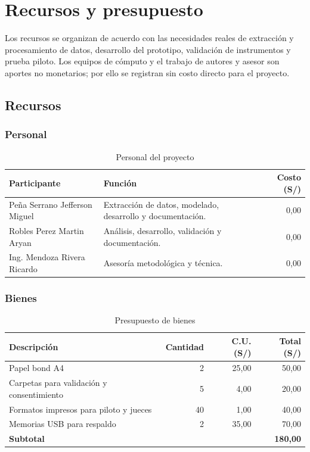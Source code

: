 \section{Recursos y presupuesto}

Los recursos se organizan de acuerdo con las necesidades reales de extracción y procesamiento de datos, desarrollo del prototipo, validación de instrumentos y prueba piloto. Los equipos de cómputo y el trabajo de autores y asesor son aportes no monetarios; por ello se registran sin costo directo para el proyecto.

\subsection{Recursos}

\subsubsection{Personal}

\begin{table}[H]
\centering
\caption{Personal del proyecto}
\small
\begin{tabularx}{\textwidth}{p{4.2cm}Xr}
\toprule
\textbf{Participante} & \textbf{Función} & \textbf{Costo (S/)} \\
\midrule
Peña Serrano Jefferson Miguel & Extracción de datos, modelado, desarrollo y documentación. & 0,00 \\
Robles Perez Martin Aryan & Análisis, desarrollo, validación y documentación. & 0,00 \\
Ing. Mendoza Rivera Ricardo & Asesoría metodológica y técnica. & 0,00 \\
\bottomrule
\end{tabularx}
\end{table}

\subsubsection{Bienes}

\begin{table}[H]
\centering
\caption{Presupuesto de bienes}
\small
\begin{tabularx}{\textwidth}{Xrrr}
\toprule
\textbf{Descripción} & \textbf{Cantidad} & \textbf{C.U. (S/)} & \textbf{Total (S/)} \\
\midrule
Papel bond A4 & 2 & 25,00 & 50,00 \\
Carpetas para validación y consentimiento & 5 & 4,00 & 20,00 \\
Formatos impresos para piloto y jueces & 40 & 1,00 & 40,00 \\
Memorias USB para respaldo & 2 & 35,00 & 70,00 \\
\midrule
\textbf{Subtotal} & & & \textbf{180,00} \\
\bottomrule
\end{tabularx}
\end{table}

